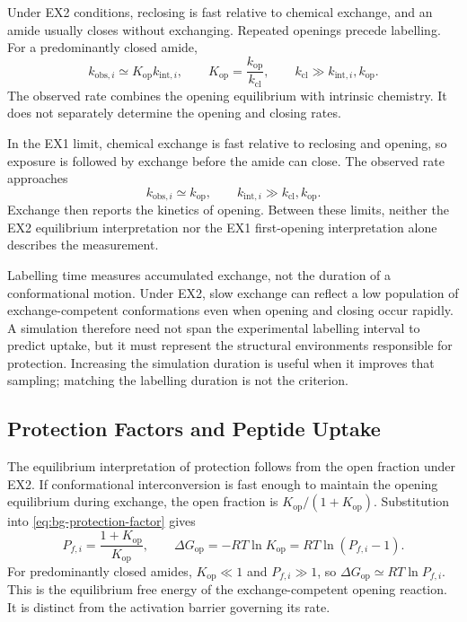 Under EX2 conditions, reclosing is fast relative to chemical exchange, and an amide usually closes without exchanging. Repeated openings precede labelling. For a predominantly closed amide,
\begin{equation}
    k_{\text{obs},i}\simeq K_{\text{op}}k_{\text{int},i},
    \qquad K_{\text{op}}=\frac{k_{\text{op}}}{k_{\text{cl}}},
    \qquad k_{\text{cl}}\gg k_{\text{int},i},k_{\text{op}}.
    \label{eq:bg-ex2}
\end{equation}
The observed rate combines the opening equilibrium with intrinsic chemistry. It does not separately determine the opening and closing rates.\supercite{skinnerProteinHydrogenExchange2012,englanderHydrogenExchangeModern1997}

In the EX1 limit, chemical exchange is fast relative to reclosing and opening, so exposure is followed by exchange before the amide can close. The observed rate approaches
\begin{equation}
    k_{\text{obs},i}\simeq k_{\text{op}},
    \qquad k_{\text{int},i}\gg k_{\text{cl}},k_{\text{op}}.
    \label{eq:bg-ex1}
\end{equation}
Exchange then reports the kinetics of opening. Between these limits, neither the EX2 equilibrium interpretation nor the EX1 first-opening interpretation alone describes the measurement.\supercite{skinnerProteinHydrogenExchange2012}

Labelling time measures accumulated exchange, not the duration of a conformational motion. Under EX2, slow exchange can reflect a low population of exchange-competent conformations even when opening and closing occur rapidly.\supercite{englanderHydrogenExchangeModern1997,skinnerProteinHydrogenExchange2012} A simulation therefore need not span the experimental labelling interval to predict uptake, but it must represent the structural environments responsible for protection. Increasing the simulation duration is useful when it improves that sampling; matching the labelling duration is not the criterion.

\subsection{Protection Factors and Peptide Uptake}
\label{sec:bg-protection-uptake}

The equilibrium interpretation of protection follows from the open fraction under EX2. If conformational interconversion is fast enough to maintain the opening equilibrium during exchange, the open fraction is $K_{\text{op}}/(1+K_{\text{op}})$. Substitution into \cref{eq:bg-protection-factor} gives
\begin{equation}
    P_{f,i}=\frac{1+K_{\text{op}}}{K_{\text{op}}},
    \qquad
    \Delta G_{\text{op}}=-RT\ln K_{\text{op}}
    =RT\ln(P_{f,i}-1).
    \label{eq:bg-opening-free-energy}
\end{equation}
For predominantly closed amides, $K_{\text{op}}\ll1$ and $P_{f,i}\gg1$, so $\Delta G_{\text{op}}\simeq RT\ln P_{f,i}$.\supercite{skinnerProteinHydrogenExchange2012,vendruscoloRareFluctuationsNative2003} This is the equilibrium free energy of the exchange-competent opening reaction. It is distinct from the activation barrier governing its rate.


